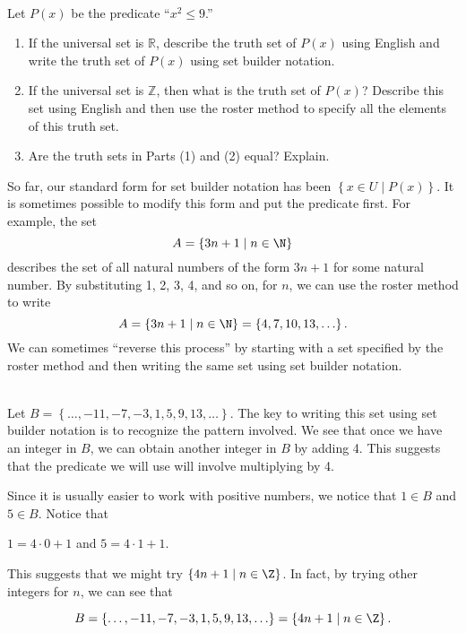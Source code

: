 \begin{prog}\label{pr:truthset} \hfill \\
Let  $P( x )$ be the predicate ``$x^2  \leq 9$.''
\begin{enumerate}
  \item If the universal set is  $\mathbb{R}$, describe the truth set of $P(x)$ using English and write the truth set of  $P( x )$ using set builder notation.  
  \item If the universal set is  $\mathbb{Z}$, then what is the truth set of  
$P( x )$?  Describe this set using English and then use the roster method to specify all the elements of this truth set.
  \item Are the truth sets in Parts (1) and (2) equal?  Explain.
\end{enumerate}

\end{prog}
\hbreak

So far, our standard form for set builder notation has been 
$\left\{ x \in U \mid P( x ) \right\}$.  It is sometimes possible to modify this form and put the predicate first.  For example, the set
\[
A = \left\{ 3n + 1 \mid n \in \N \right\}
\]
describes the set of all natural numbers of the form $3n + 1$ for some natural number.  By substituting 1, 2, 3, 4, and so on, for $n$, we can use the roster method to write
\[
A = \left\{ 3n + 1 \mid n \in \N \right\} = \left\{4, 7, 10, 13, \ldots \right\}.
\]
We can sometimes ``reverse this process'' by starting with a set specified by the roster method and then writing the same set using set builder notation.

\begin{example} \hfill \\
Let $B = \left\{ \ldots, -11, -7, -3, 1, 5, 9, 13, \ldots \right\}$.  The key to writing this set using set builder notation is to recognize the pattern involved.  We see that once we have an integer in $B$, we can obtain another integer in $B$ by adding 4.  This suggests that the predicate we will use will involve multiplying by 4.

Since it is usually easier to work with positive numbers, we notice that $1 \in B$ and 
$5 \in B$.  Notice that

\begin{center}
$1 = 4 \cdot 0 + 1$ \qquad and \qquad $5 = 4 \cdot 1 + 1$.
\end{center}

This suggests that we might try $\left\{ 4n + 1 \mid n \in \Z \right\}$.  In fact, by trying other integers for $n$, we can see that

\[
B = \left\{ \ldots, -11, -7, -3, 1, 5, 9, 13, \ldots \right\} = \left\{ 4n + 1 \mid n \in \Z \right\}.
\]
\end{example}
\hbreak

